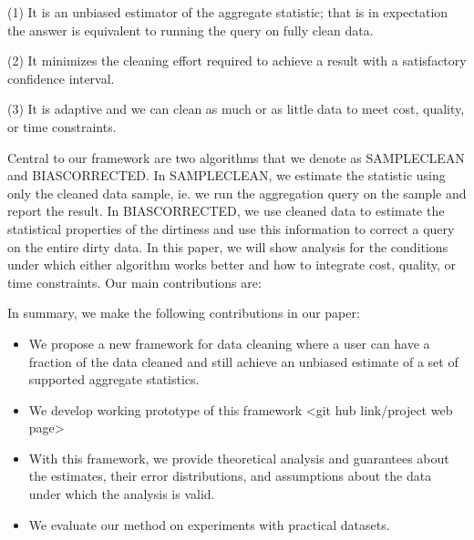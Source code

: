 (1) It is an unbiased estimator of the aggregate statistic; that is in expectation the answer is equivalent to running the query on fully clean data.

(2) It minimizes the cleaning effort required to achieve a result with a satisfactory confidence interval.

(3) It is adaptive and we can clean as much or as little data to meet cost, quality, or time constraints.

Central to our framework are two algorithms that we denote as SAMPLECLEAN and BIASCORRECTED. In SAMPLECLEAN, we estimate the statistic using only the cleaned data sample, ie. we run the aggregation query on the sample and report the result.  In BIASCORRECTED, we use cleaned data to estimate the statistical properties of the dirtiness and use this information to correct a query on the entire dirty data. In this paper, we will show analysis for the conditions under which either algorithm works better and how to integrate cost, quality, or time constraints. Our main contributions are:

In summary, we make the following contributions in our paper:
\begin{itemize}
\item We propose a new framework for data cleaning where a user can have a fraction of the data cleaned and still achieve an unbiased estimate of a set of supported aggregate statistics.
\item We develop working prototype of this framework <git hub link/project web page>
\item With this framework, we provide theoretical analysis and guarantees about the estimates, their error distributions, and assumptions about the data under which the analysis is valid.
\item We evaluate our method on experiments with practical datasets.
\end{itemize}


\fi
